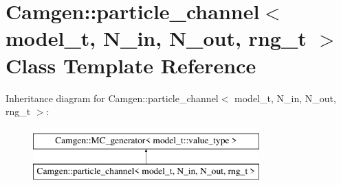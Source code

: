 \hypertarget{a00395}{\section{Camgen\-:\-:particle\-\_\-channel$<$ model\-\_\-t, N\-\_\-in, N\-\_\-out, rng\-\_\-t $>$ Class Template Reference}
\label{a00395}
}
Inheritance diagram for Camgen\-:\-:particle\-\_\-channel$<$ model\-\_\-t, N\-\_\-in, N\-\_\-out, rng\-\_\-t $>$\-:\begin{figure}[H]
\begin{center}
\leavevmode
\includegraphics[height=2.000000cm]{a00395}
\end{center}
\end{figure}
